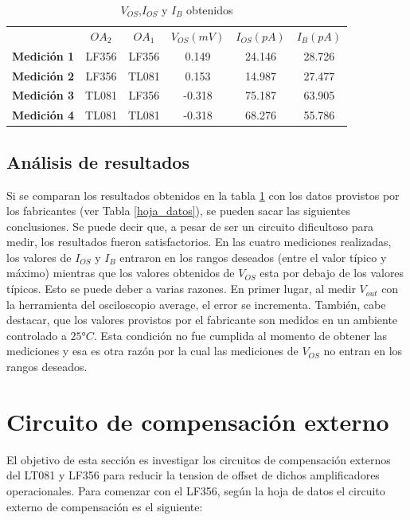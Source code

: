 \begin{table}[ht]
    \centering
    \caption{$V_{OS}$,$I_{OS}$ y $I_B$ obtenidos}
    \label{table5}
    \begin{tabular}{@{}cccccc@{}}
    \textbf{}           & \textbf{$OA_2$} & \textbf{$OA_1$} & \textbf{$V_{OS} (mV)$}   & \textbf{$I_{OS} (pA)$} & \textbf{$I_B (pA)$} \\ 
    \textbf{Medición 1} & LF356          & LF356      & 0.149                          & 24.146                 & 28.726             \\
    \textbf{Medición 2} & LF356          & TL081      & 0.153                          & 14.987                 & 27.477                  \\
    \textbf{Medición 3} & TL081          & LF356      & -0.318                         & 75.187                 & 63.905                  \\
    \textbf{Medición 4} & TL081          & TL081      & -0.318                         & 68.276                 & 55.786                  \\ 
    \end{tabular}
\end{table}


\subsection{Análisis de resultados}
Si se comparan los resultados obtenidos en la tabla \ref{table5} con los datos provistos por los fabricantes (ver Tabla \ref{hoja_datos}), se pueden sacar las siguientes conclusiones. Se puede decir que, a pesar de 
ser un circuito dificultoso para medir, los resultados fueron satisfactorios. En las cuatro mediciones realizadas, los valores de $I_{OS}$ y $I_B$ entraron en los rangos deseados (entre el valor típico y máximo) mientras 
que los valores obtenidos de $V_{OS}$ esta por debajo de los valores típicos. Esto se puede deber a varias razones. En primer lugar, al medir $V_{out}$ con la herramienta del osciloscopio average, el error se incrementa. También, cabe destacar, que
los valores provistos por el fabricante son medidos en un ambiente controlado a $25 °C$. Esta condición no fue cumplida al momento de obtener las mediciones y esa es otra razón por la cual las mediciones de $V_{OS}$ no entran en los rangos deseados.   

\section{Circuito de compensación externo}
El objetivo de esta sección es investigar los circuitos de compensación externos del LT081 y LF356 para reducir la tension de offset de dichos amplificadores operacionales.
Para comenzar con el LF356, según la hoja de datos el circuito externo de compensación es el siguiente: 

